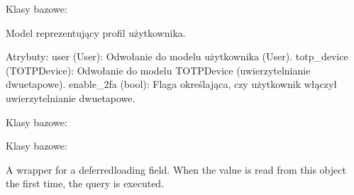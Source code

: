 \documentclass[letterpaper,11pt,polish]{sphinxmanual}
\begin{document}
\begin{fulllineitems}
\label{\detokenize{mainApp:mainApp.models.UserProfile}}
\pysigstartsignatures
{}
\pysigstopsignatures
\sphinxAtStartPar
Klasy bazowe: 

\sphinxAtStartPar
Model reprezentujący profil użytkownika.

\sphinxAtStartPar
Atrybuty:
\sphinxhyphen{} user (User): Odwołanie do modelu użytkownika (User).
\sphinxhyphen{} totp\_device (TOTPDevice): Odwołanie do modelu TOTPDevice (uwierzytelnianie dwuetapowe).
\sphinxhyphen{} enable\_2fa (bool): Flaga określająca, czy użytkownik włączył uwierzytelnianie dwuetapowe.

\begin{fulllineitems}
\label{\detokenize{mainApp:mainApp.models.UserProfile.DoesNotExist}}
\pysigstartsignatures
{}
\pysigstopsignatures
\sphinxAtStartPar
Klasy bazowe: 

\end{fulllineitems}


\begin{fulllineitems}
\label{\detokenize{mainApp:mainApp.models.UserProfile.MultipleObjectsReturned}}
\pysigstartsignatures
{}
\pysigstopsignatures
\sphinxAtStartPar
Klasy bazowe: 

\end{fulllineitems}


\begin{fulllineitems}
\label{\detokenize{mainApp:mainApp.models.UserProfile.enable_2fa}}
\pysigstartsignatures
{}
\pysigstopsignatures
\sphinxAtStartPar
A wrapper for a deferred\sphinxhyphen{}loading field. When the value is read from this
object the first time, the query is executed.


\end{fulllineitems}
\end{fulllineitems}
\end{document}
